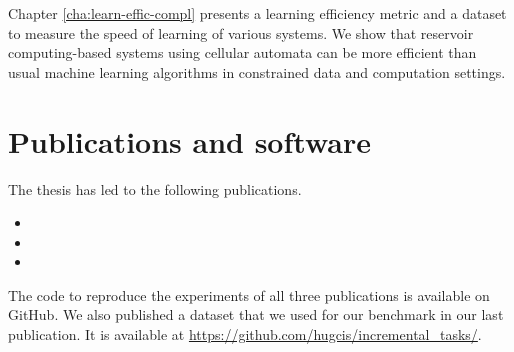Chapter \ref{cha:learn-effic-compl} presents a learning efficiency metric and a
dataset to measure the speed of learning of various systems. We show that
reservoir computing-based systems using cellular automata can be more efficient
than usual machine learning algorithms in constrained data and computation
settings.

\section{Publications and software}

The thesis has led to the following publications.

\begin{itemize}
  \item {}
  \item {}
  \item {}
\end{itemize}

The code to reproduce the experiments of all three publications is available on
GitHub. We also published a dataset that we used for our benchmark in our last
publication. It is available at
\url{https://github.com/hugcis/incremental_tasks/}.

